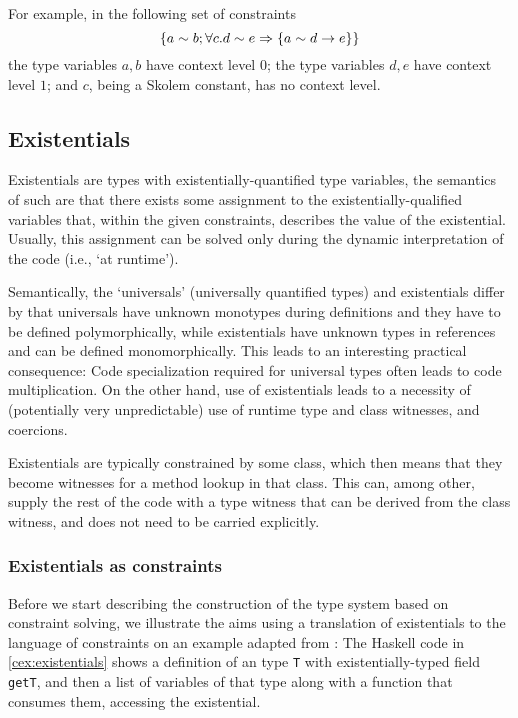 For example, in the following set of constraints
\[ \left\{ a \sim b; \forall c. d \sim e \Rightarrow \left\{ a \sim d \to e \right\} \right\} \]
the type variables $a, b$ have context level $0$; the type variables $d, e$ have context level $1$; and $c$, being a Skolem constant, has no context level.

\subsection{Existentials}

\label{existentials}

Existentials are types with existentially-quantified type variables, the semantics of such are that there exists some assignment to the existentially-qualified variables that, within the given constraints, describes the value of the existential. Usually, this assignment can be solved only during the dynamic interpretation of the code (i.e., `at runtime').

Semantically, the `universals' (universally quantified types) and existentials differ by that universals have unknown monotypes during definitions and they have to be defined polymorphically, while existentials have unknown types in references and can be defined monomorphically. This leads to an interesting practical consequence: Code specialization required for universal types often leads to code multiplication. On the other hand, use of existentials leads to a necessity of (potentially very unpredictable) use of runtime type and class witnesses, and coercions.

Existentials are typically constrained by some class, which then means that they become witnesses for a method lookup in that class. This can, among other, supply the rest of the code with a type witness that can be derived from the class witness, and does not need to be carried explicitly.

\subsubsection{Existentials as constraints}

Before we start describing the construction of the type system based on constraint solving, we illustrate the aims using a translation of existentials to the language of constraints on an example adapted from \citet{peytonjones2019type}:
The Haskell code in \cref{cex:existentials} shows a definition of an type \lstinline{T} with existentially-typed field \lstinline{getT}, and then a list of variables of that type along with a function that consumes them, accessing the existential.

